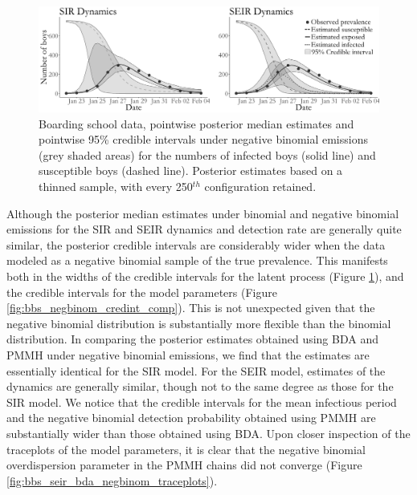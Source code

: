 \begin{figure}[htbp]
	\centering
	\includegraphics[width=\linewidth]{figures/bbs_latent_post_negbinom.pdf}
	\caption[Latent posterior estimates of prevalence in a boarding school under negative binomial emissions.]{Boarding school data, pointwise posterior median estimates and pointwise 95\% credible intervals under negative binomial emissions (grey shaded areas) for the numbers of infected boys (solid line) and susceptible boys (dashed line). Posterior estimates based on a thinned sample, with every 250$ ^{th} $ configuration retained.}
	\label{fig:bbs_dat_negbinom}
\end{figure}

Although the posterior median estimates under binomial and negative binomial emissions for the SIR and SEIR dynamics and detection rate are generally quite similar, the posterior credible intervals are considerably wider when the data modeled as a negative binomial sample of the true prevalence. This manifests both in the widths of the credible intervals for the latent process (Figure \ref{fig:bbs_dat_negbinom}), and the credible intervals for the model parameters (Figure \ref{fig:bbs_negbinom_credint_comp}). This is not unexpected given that the negative binomial distribution is substantially more flexible than the binomial distribution. In comparing the posterior estimates obtained using BDA and PMMH under negative binomial emissions, we find that the estimates are essentially identical for the SIR model. For the SEIR model, estimates of the dynamics are generally similar, though not to the same degree as those for the SIR model. We notice that the credible intervals for the mean infectious period and the negative binomial detection probability obtained using PMMH are substantially wider than those obtained using BDA. Upon closer inspection of the traceplots of the model parameters, it is clear that the negative binomial overdispersion parameter in the PMMH chains did not converge (Figure \ref{fig:bbs_seir_bda_negbinom_traceplots}).

